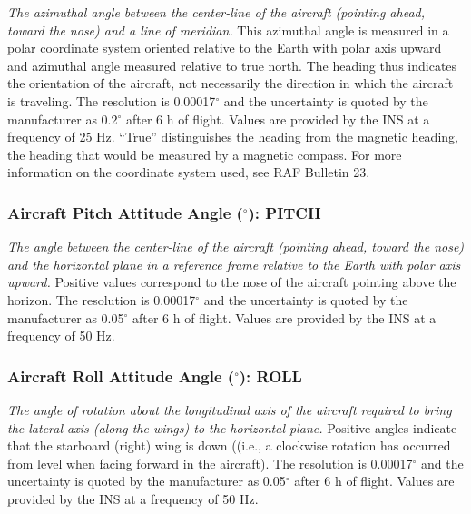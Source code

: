 \documentclass[
]{book}
\begin{document}
\emph{The azimuthal angle between the center-line of the aircraft (pointing ahead, toward the nose) and a line of meridian.} This azimuthal angle is measured in a polar coordinate system oriented relative to the Earth with polar axis upward and azimuthal angle measured relative to true north. The heading thus indicates the orientation of the aircraft, not necessarily the direction in which the aircraft is traveling. The resolution is 0.00017\(^{\circ}\)
and the uncertainty is quoted by the manufacturer as 0.2\(^{\circ}\)
after 6 h of flight. Values are provided by the INS at a frequency of 25 Hz. ``True'' distinguishes the heading from the magnetic heading, the heading that would be measured by a magnetic compass. For more information on the coordinate system used, see RAF Bulletin 23.

\hypertarget{pitch}{%
\subsubsection*{\texorpdfstring{Aircraft Pitch Attitude Angle (\(^{\circ}\)): PITCH}{Aircraft Pitch Attitude Angle (\^{}\{\textbackslash circ\}): PITCH}}\label{pitch}}

\emph{The angle between the center-line of the aircraft (pointing ahead, toward the nose) and the horizontal plane in a reference frame relative to the Earth with polar axis upward.} Positive values correspond to the nose of the aircraft pointing above the horizon. The resolution is 0.00017\(^{\circ}\)
and the uncertainty is quoted by the manufacturer as 0.05\(^{\circ}\)
after 6 h of flight. Values are provided by the INS at a frequency of 50 Hz.

\hypertarget{roll}{%
\subsubsection*{\texorpdfstring{Aircraft Roll Attitude Angle (\(^{\circ}\)): ROLL}{Aircraft Roll Attitude Angle (\^{}\{\textbackslash circ\}): ROLL}}\label{roll}}

\emph{The angle of rotation about the longitudinal axis of the aircraft required to bring the lateral axis (along the wings) to the horizontal plane.} Positive angles indicate that the starboard (right) wing is down ((i.e., a clockwise rotation has occurred from level when facing forward in the aircraft). The resolution is 0.00017\(^{\circ}\)
and the uncertainty is quoted by the manufacturer as 0.05\(^{\circ}\)
after 6 h of flight. Values are provided by the INS at a frequency of 50 Hz.
\end{document}
